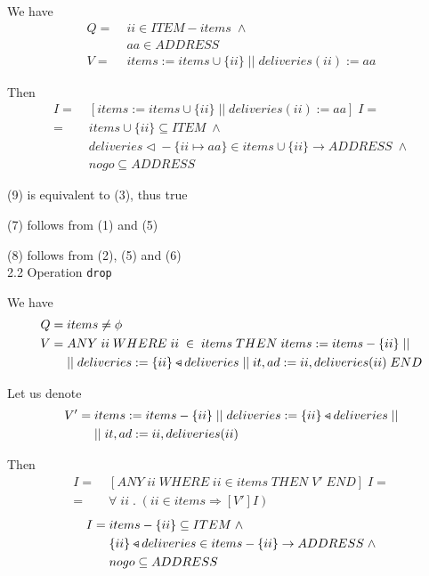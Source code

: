 \documentclass[11pt]{article}
\begin{document}
We have 
\begin{align}
  Q = \; & ii \in ITEM - items \; \wedge\\
	       & aa \in ADDRESS \\
	V = \; & items := items \cup \{ii\} \; || \; deliveries(ii) := aa \nonumber
\end{align}

Then
\begin{align}
    [V]I = \; & [items := items \cup \{ii\} \; || \; deliveries(ii) := aa] \; I = \nonumber \\	  
			   = \; & items \cup \{ii\} \subseteq ITEM \; \wedge \\
					    & deliveries \triangleleft \!\!\!\!- \{ ii \mapsto aa\} \in items \cup \{ii\} \rightarrow ADDRESS \; \wedge \\
							& nogo \subseteq ADDRESS
\end{align}

(9) is equivalent to (3), thus true

(7) follows from (1) and (5)

(8) follows from (2), (5) and (6) \\


2.2 Operation \texttt{drop}

We have 
\begin{align}
  Q = \; & items \neq \phi \\
	V = \; & ANY \; ii \; WHERE \; ii \; \in \; items \; THEN  \; items := items - \{ii\} \; || \nonumber \\
	       & || \; deliveries := \{ii\} \mathbin{\triangleleft \llap{-}} deliveries \; || \; it,ad := ii, deliveries(ii) \; END \nonumber
\end{align}

Let us denote
\begin{align*}
  V' = & \; items := items - \{ii\} \; || \; deliveries := \{ii\} \mathbin{\triangleleft \llap{-}} deliveries \; || \\
	     & \; || \; it,ad := ii, deliveries(ii)
\end{align*}

Then
\begin{align}
    [V]I = & \; [ANY \; ii \; WHERE \; ii \in items \; THEN \; V' \; END ] \; I  = \nonumber \\
		     = & \; \forall \; ii \; . \; (ii \in items \Rightarrow [V']I ) \nonumber 
\end{align}
\begin{align}
    [V']I = \; & items - \{ii\} \subseteq ITEM \; \wedge \\
		        \; & \{ii\} \mathbin{\triangleleft \llap{-}} deliveries \in items - \{ii\} \rightarrow ADDRESS \; \wedge \\
						\; & nogo \subseteq ADDRESS
\end{align}
\end{document}

